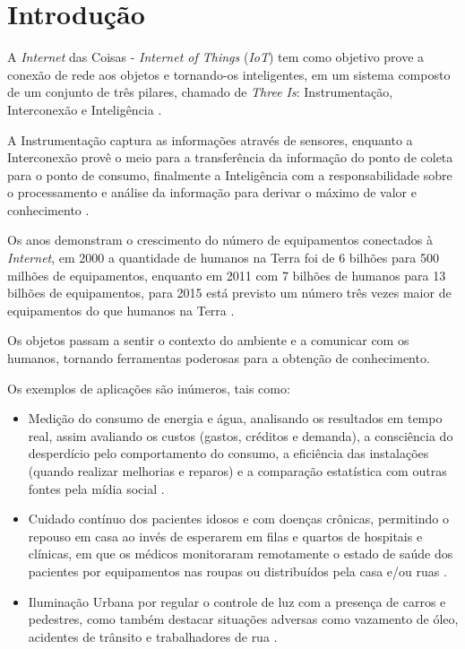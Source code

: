 %


\chapter{Introdução}

A \textit{Internet} das Coisas - \textit{Internet of Things} (\textit{IoT}) tem
como objetivo prove a conexão de rede aos objetos e tornando-os inteligentes,
em um sistema composto de um conjunto de três pilares, chamado de \textit{Three
  Is}: Instrumentação, Interconexão e Inteligência \cite{mqttibm2012}.

A Instrumentação captura as informações através de sensores, enquanto a
Interconexão provê o meio para a transferência da informação do ponto de coleta
para o ponto de consumo, finalmente a Inteligência com a responsabilidade sobre
o processamento e análise da informação para derivar o máximo de valor e
conhecimento \cite{mqttibm2012}.

Os anos demonstram o crescimento do número de equipamentos conectados à
\textit{Internet}, em 2000 a quantidade de humanos na Terra foi de 6 bilhões
para 500 milhões de equipamentos, enquanto em 2011 com 7 bilhões de humanos
para 13 bilhões de equipamentos, para 2015 está previsto um número três vezes
maior de equipamentos do que humanos na Terra \cite{mirkopresser2012}.

Os objetos passam a sentir o contexto do ambiente e a comunicar com os humanos,
tornando ferramentas poderosas para a obtenção de conhecimento.

Os exemplos de aplicações são inúmeros, tais como:

\begin{itemize}

    \item Medição do consumo de energia e água, analisando os resultados em
      tempo real, assim avaliando os custos (gastos, créditos e demanda), a
      consciência do desperdício pelo comportamento do consumo, a eficiência
      das instalações (quando realizar melhorias e reparos) e a comparação
      estatística com outras fontes pela mídia social \cite{mirkopresser2012}.

    \item Cuidado contínuo dos pacientes idosos e com doenças crônicas,
      permitindo o repouso em casa ao invés de esperarem em filas e quartos de
      hospitais e clínicas, em que os médicos monitoraram remotamente o estado
      de saúde dos pacientes por equipamentos nas roupas ou distribuídos pela
      casa e/ou ruas \cite{mirkopresser2012}.

    \item Iluminação Urbana por regular o controle de luz com a presença de
      carros e pedestres, como também destacar situações adversas como
      vazamento de óleo, acidentes de trânsito e trabalhadores de rua
      \cite{mirkopresser2012}.

\end{itemize}

